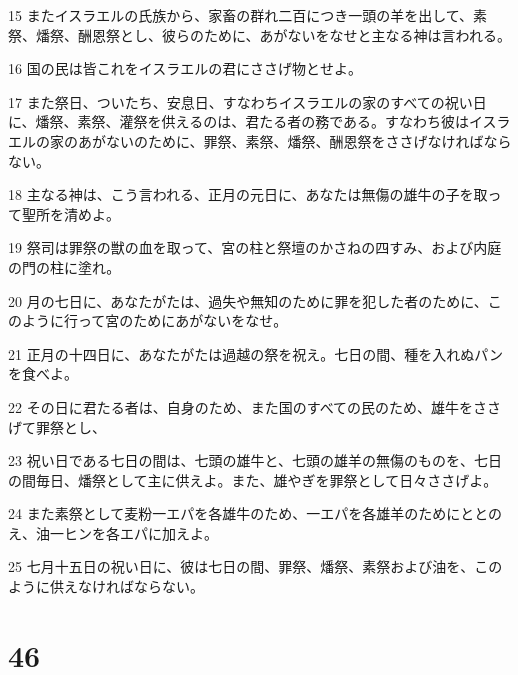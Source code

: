 \par 15 またイスラエルの氏族から、家畜の群れ二百につき一頭の羊を出して、素祭、燔祭、酬恩祭とし、彼らのために、あがないをなせと主なる神は言われる。
\par 16 国の民は皆これをイスラエルの君にささげ物とせよ。
\par 17 また祭日、ついたち、安息日、すなわちイスラエルの家のすべての祝い日に、燔祭、素祭、灌祭を供えるのは、君たる者の務である。すなわち彼はイスラエルの家のあがないのために、罪祭、素祭、燔祭、酬恩祭をささげなければならない。
\par 18 主なる神は、こう言われる、正月の元日に、あなたは無傷の雄牛の子を取って聖所を清めよ。
\par 19 祭司は罪祭の獣の血を取って、宮の柱と祭壇のかさねの四すみ、および内庭の門の柱に塗れ。
\par 20 月の七日に、あなたがたは、過失や無知のために罪を犯した者のために、このように行って宮のためにあがないをなせ。
\par 21 正月の十四日に、あなたがたは過越の祭を祝え。七日の間、種を入れぬパンを食べよ。
\par 22 その日に君たる者は、自身のため、また国のすべての民のため、雄牛をささげて罪祭とし、
\par 23 祝い日である七日の間は、七頭の雄牛と、七頭の雄羊の無傷のものを、七日の間毎日、燔祭として主に供えよ。また、雄やぎを罪祭として日々ささげよ。
\par 24 また素祭として麦粉一エパを各雄牛のため、一エパを各雄羊のためにととのえ、油一ヒンを各エパに加えよ。
\par 25 七月十五日の祝い日に、彼は七日の間、罪祭、燔祭、素祭および油を、このように供えなければならない。

\chapter{46}


